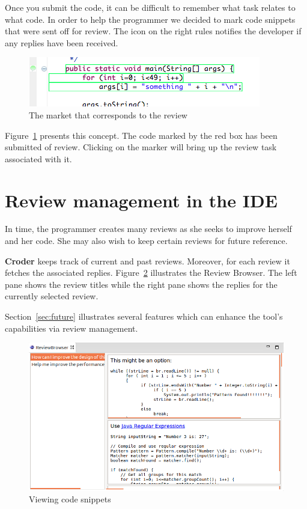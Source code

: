 \documentclass{sigchi}
\newcommand{\croder}{\textbf{Croder }}
\begin{document}
Once you submit the code, it can be difficult to remember what task relates to what code. In order to help
the programmer we decided to mark code snippets that were sent off for review. The icon on the right
rules notifies the developer if any replies have been received. 

\begin{figure}[hbt]
	\includegraphics[width=\columnwidth]{marker.png}
\caption{The market that corresponds to the review}
\label{fig:marker}
\end{figure}

Figure~\ref{fig:marker} presents this concept. The code marked by the red box has been submitted of
review. Clicking on the marker will bring up the review task associated with it.

\section{Review management in the IDE}

In time, the programmer creates many reviews as she seeks to improve herself and her code. She may also wish to keep certain reviews for future reference. 

\croder keeps track of current and past reviews. Moreover, for each review it fetches the associated replies. Figure~\ref{fig:reviewBrowser} illustrates the Review Browser. The left pane shows the review titles while the right pane shows the replies for the currently selected review.

Section~\ref{sec:future} illustrates several features which can enhance the tool's capabilities via review management.

\begin{figure}[hbt]
	\centering
	\includegraphics[width=\columnwidth]{reviewBrowser.png}
\caption{Viewing code snippets}
\label{fig:reviewBrowser}
\end{figure}
\end{document}
